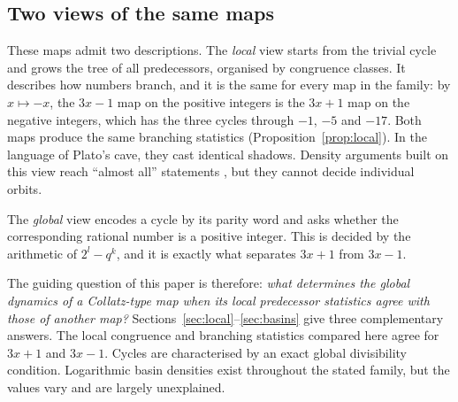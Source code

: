 \documentclass[12pt]{amsart}
\theoremstyle{definition}
\theoremstyle{remark}
\begin{document}
\subsection*{Two views of the same maps}
These maps admit two descriptions. The \emph{local} view starts from the trivial cycle and grows the tree of all predecessors, organised by congruence classes. It describes how numbers branch, and it is the same for every map in the family: by $x\mapsto -x$, the $3x-1$ map on the positive integers is the $3x+1$ map on the negative integers, which has the three cycles through $-1$, $-5$ and $-17$. Both maps produce the same branching statistics (Proposition~\ref{prop:local}). In the language of Plato's cave, they cast identical shadows. Density arguments built on this view reach ``almost all'' statements \cite{Terras_1976,Tao_2022}, but they cannot decide individual orbits.

The \emph{global} view encodes a cycle by its parity word and asks whether the corresponding rational number is a positive integer. This is decided by the arithmetic of $2^l-q^k$, and it is exactly what separates $3x+1$ from $3x-1$.

The guiding question of this paper is therefore: \emph{what determines the global dynamics of a Collatz-type map when its local predecessor statistics agree with those of another map?} Sections~\ref{sec:local}--\ref{sec:basins} give three complementary answers. The local congruence and branching statistics compared here agree for $3x+1$ and $3x-1$. Cycles are characterised by an exact global divisibility condition. Logarithmic basin densities exist throughout the stated family, but the values vary and are largely unexplained.
\end{document}
